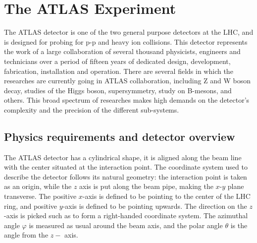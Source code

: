 \chapter{The ATLAS Experiment}
\label{sec:ATLAS}

The ATLAS detector is one of the two general purpose detectors at the LHC, and is designed for probing for p-p and heavy ion collisions. This detector represents the work of a large collaboration of several thousand physicists, engineers and technicians over a period of fifteen years of dedicated design, development, fabrication, installation and operation. There are several fields in which the researches are currently going in ATLAS collaboration, including Z and W boson decay, studies of the Higgs boson, supersymmetry, study on B-mesons, and others. This broad spectrum of researches makes high demands on the detector's complexity and the precision of the different sub-systems.

\section{Physics requirements and detector overview}
\label{sec:ATLAS_overview}
The ATLAS detector has a cylindrical shape, it is aligned along the beam line with the center situated at the interaction point. The coordinate system used to describe the detector follows its natural geometry: the interaction point is taken as an origin, while the $z$ axis is put along the beam pipe, making the $x$-$y$ plane transverse. The positive $x$-axis is defined to be pointing to the center of the LHC ring, and positive $y$-axis is defined to be pointing upwards. The direction on the $z$-axis is picked such as to form a right-handed coordinate system. The azimuthal angle $\varphi$ is measured as usual around the beam axis, and the polar angle $\theta$ is the angle from the $z-$ axis.

\begin{figure}
\end{figure}

